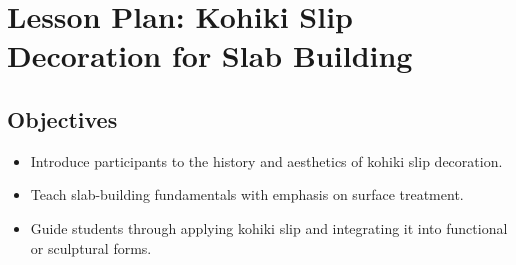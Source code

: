 \documentclass[12pt]{scrartcl}
\begin{document}

\section*{Lesson Plan: Kohiki Slip Decoration for Slab Building}

\subsection*{Objectives}
\begin{itemize}
  \item Introduce participants to the history and aesthetics of kohiki slip decoration.
  \item Teach slab-building fundamentals with emphasis on surface treatment.
  \item Guide students through applying kohiki slip and integrating it into functional or sculptural forms.
\end{itemize}
\end{document}
